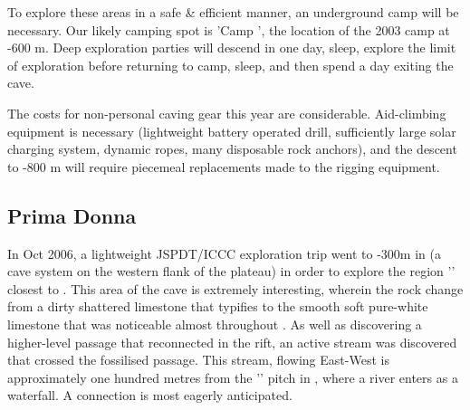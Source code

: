 To explore these areas in a safe \& efficient manner, an underground camp will be necessary. Our likely camping spot is 'Camp ', the location of the 2003 camp at -600 m. Deep exploration parties will descend in one day, sleep, explore the limit of exploration before returning to camp, sleep, and then spend a day exiting the cave.

The costs for non-personal caving gear this year are considerable. Aid-climbing equipment is necessary (lightweight battery operated drill, sufficiently large solar charging system, dynamic ropes, many disposable rock anchors), and the descent to -800 m will require piecemeal replacements made to the rigging equipment.





\subsection{Prima Donna}

In Oct 2006, a lightweight JSPDT/ICCC exploration trip went to -300m in  (a cave system on the western flank of the plateau) in order to explore the region '' closest to . This area of the cave is extremely interesting, wherein the rock change from a dirty shattered limestone that typifies  to the smooth soft pure-white limestone that was noticeable almost throughout . As well as discovering a higher-level passage that reconnected in the rift, an active stream was discovered that crossed the fossilised passage. This stream, flowing East-West is approximately one hundred metres from the '' pitch in , where a river enters as a waterfall. A connection is most eagerly anticipated.


